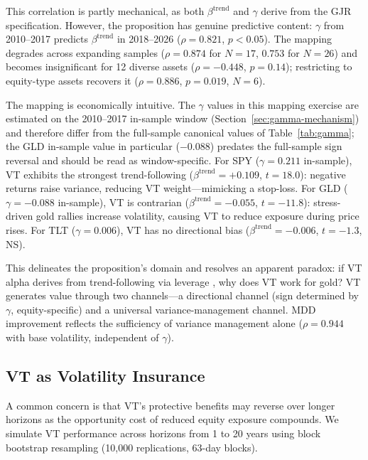 This correlation is partly mechanical, as both $\beta^{\text{trend}}$ and $\gamma$ derive from the GJR specification. However, the proposition has genuine predictive content: $\gamma$ from 2010--2017 predicts $\beta^{\text{trend}}$ in 2018--2026 ($\rho = 0.821$, $p < 0.05$). The mapping degrades across expanding samples ($\rho = 0.874$ for $N = 17$, $0.753$ for $N = 26$) and becomes insignificant for 12 diverse assets ($\rho = -0.448$, $p = 0.14$); restricting to equity-type assets recovers it ($\rho = 0.886$, $p = 0.019$, $N = 6$).

The mapping is economically intuitive. The $\gamma$ values in this mapping exercise are estimated on the 2010--2017 in-sample window (Section~\ref{sec:gamma-mechanism}) and therefore differ from the full-sample canonical values of Table~\ref{tab:gamma}; the GLD in-sample value in particular ($-0.088$) predates the full-sample sign reversal and should be read as window-specific. For SPY ($\gamma = 0.211$ in-sample), VT exhibits the strongest trend-following ($\beta^{\text{trend}} = +0.109$, $t = 18.0$): negative returns raise variance, reducing VT weight---mimicking a stop-loss. For GLD ($\gamma = -0.088$ in-sample), VT is contrarian ($\beta^{\text{trend}} = -0.055$, $t = -11.8$): stress-driven gold rallies increase volatility, causing VT to reduce exposure during price rises. For TLT ($\gamma = 0.006$), VT has no directional bias ($\beta^{\text{trend}} = -0.006$, $t = -1.3$, NS).

This delineates the proposition's domain and resolves an apparent paradox: if VT alpha derives from trend-following via leverage \citep{hood2025}, why does VT work for gold? VT generates value through two channels---a directional channel (sign determined by $\gamma$, equity-specific) and a universal variance-management channel. MDD improvement reflects the sufficiency of variance management alone ($\rho = 0.944$ with base volatility, independent of $\gamma$).

\subsection{VT as Volatility Insurance}
\label{sec:vt_insurance}

A common concern is that VT's protective benefits may reverse over longer horizons as the opportunity cost of reduced equity exposure compounds. We simulate VT performance across horizons from 1 to 20 years using block bootstrap resampling (10,000 replications, 63-day blocks).

